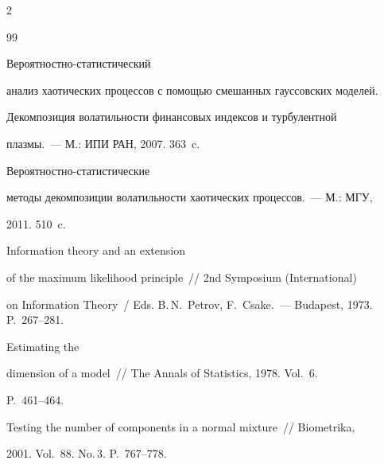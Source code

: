 \pagebreak








\begin{multicols}{2}




{\small\frenchspacing

{%


\begin{thebibliography}{99}




 Ве\-ро\-ят\-ност\-но-ста\-ти\-сти\-че\-ский

анализ хаотических процессов с помощью смешанных гауссовских моделей.

Декомпозиция волатильности финансовых индексов и турбулентной

плазмы.~--- М.: ИПИ РАН, 2007. 363~c.



 Ве\-ро\-ят\-ност\-но-ста\-ти\-сти\-че\-ские

методы декомпозиции волатильности хаотических процессов.~--- М.: МГУ,

2011. 510~c.



 Information theory and an extension

of the maximum likelihood principle~// 2nd Symposium (International) 

on Information Theory~/ Eds. B.\,N.~Petrov, F.~Csake.~--- Budapest, 1973. P.~267--281.



 Estimating the

dimension of a model~// The Annals of Statistics, 1978. Vol.~6.

P.~461--464.




Testing the number of components in a normal mixture~// Biometrika,

2001. Vol.~88. No.\,3. P.~767--778.




\end{thebibliography}}}
\end{multicols}
